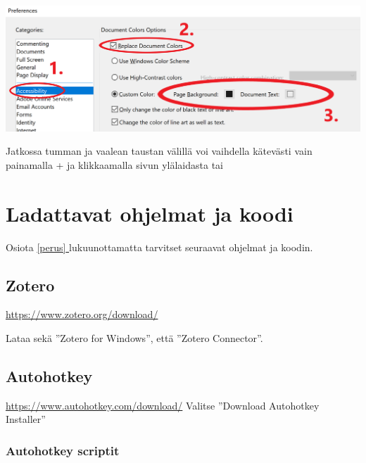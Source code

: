 \documentclass[a4paper,12pt]{scrartcl}
\newcommand*{\fullref}[1]{\hyperref[{#1}]{\ref*{#1} \nameref*{#1}}} %
\begin{document}
\includegraphics[width=\textwidth]{adobe_reader}

Jatkossa tumman ja vaalean taustan välillä voi vaihdella kätevästi vain painamalla +  ja klikkaamalla sivun ylälaidasta  tai 

\pagebreak \section{Ladattavat ohjelmat ja koodi}
Osiota \fullref{perus} lukuunottamatta tarvitset seuraavat ohjelmat ja koodin.





\subsection{Zotero}
\url{https://www.zotero.org/download/}


Lataa sekä ''Zotero for Windows'', että ''Zotero Connector''. 

\subsection{Autohotkey}
\url{https://www.autohotkey.com/download/}
Valitse ''Download Autohotkey Installer''

\subsubsection{Autohotkey scriptit} \label{downloads}
\end{document}
